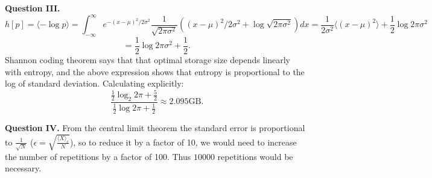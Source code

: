\documentclass[letterpaper, reqno,11pt]{article}
\begin{document}
{\medskip\noindent\bf Question III.} 
\[
    h[p] = \langle -\log p \rangle =\int_{-\infty}^{\infty}e^{-(x-\mu)^2 /2\sigma^2} \frac{1}{\sqrt{2\pi\sigma^2}}\left( (x-\mu)^2 /2\sigma^2+\log\sqrt{2\pi\sigma^2} \right) dx=\frac{1}{2\sigma^2}\langle (x-\mu)^2 \rangle +\frac{1}{2}\log 2\pi\sigma^2
\]
\[
=\frac{1}{2}\log 2\pi\sigma^2 + \frac{1}{2}
.\]
Shannon coding theorem says that that optimal storage size depends linearly with entropy, and the above expression shows that entropy is proportional to the log of standard deviation. Calculating explicitly:
\[
    \frac{\frac{1}{2}\log_2 2\pi+\frac{5}{2}}{\frac{1}{2}\log 2\pi+\frac{1}{2}}\approx 2.095\text{GB}
.\]

{\medskip\noindent\bf Question IV.} From the central limit theorem the standard error is proportional to $\frac{1}{\sqrt{N}}$ ($\epsilon= \sqrt{\frac{\langle X \rangle _c}{N}}$), so to reduce it by a factor of 10, we would need to increase the number of repetitions by a factor of 100. Thus $10000$ repetitions would be necessary.
\end{document}
